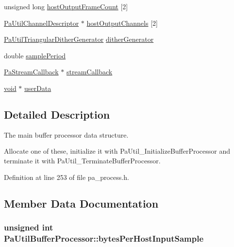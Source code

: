 \begin{DoxyCompactItemize}
unsigned long \hyperlink{struct_pa_util_buffer_processor_ac5e048842fdfdee1764ab049a1306cfe}{host\+Output\+Frame\+Count} \mbox{[}2\mbox{]}
\item 
\hyperlink{struct_pa_util_channel_descriptor}{Pa\+Util\+Channel\+Descriptor} $\ast$ \hyperlink{struct_pa_util_buffer_processor_a6d78b9d008d30e6addc9a83470756831}{host\+Output\+Channels} \mbox{[}2\mbox{]}
\item 
\hyperlink{struct_pa_util_triangular_dither_generator}{Pa\+Util\+Triangular\+Dither\+Generator} \hyperlink{struct_pa_util_buffer_processor_a113fbcc8dab47dc9eb29b9541520084b}{dither\+Generator}
\item 
double \hyperlink{struct_pa_util_buffer_processor_aea54ceb550e1d66824d6f8cf55af8489}{sample\+Period}
\item 
\hyperlink{portaudio_8h_a8a60fb2a5ec9cbade3f54a9c978e2710}{Pa\+Stream\+Callback} $\ast$ \hyperlink{struct_pa_util_buffer_processor_af6577f767ed4c58d5e511d125e6b1c4a}{stream\+Callback}
\item 
\hyperlink{sound_8c_ae35f5844602719cf66324f4de2a658b3}{void} $\ast$ \hyperlink{struct_pa_util_buffer_processor_aa0c7b972bd1494d40373e9e13475af4b}{user\+Data}
\end{DoxyCompactItemize}


\subsection{Detailed Description}
The main buffer processor data structure. 

Allocate one of these, initialize it with Pa\+Util\+\_\+\+Initialize\+Buffer\+Processor and terminate it with Pa\+Util\+\_\+\+Terminate\+Buffer\+Processor. 

Definition at line 253 of file pa\+\_\+process.\+h.



\subsection{Member Data Documentation}
\subsubsection[{\texorpdfstring{bytes\+Per\+Host\+Input\+Sample}{bytesPerHostInputSample}}]{\setlength{\rightskip}{0pt plus 5cm}unsigned {\bf int} Pa\+Util\+Buffer\+Processor\+::bytes\+Per\+Host\+Input\+Sample}\hypertarget{struct_pa_util_buffer_processor_ad7d3d4973cfe90f69dbb2fcf16a59d92}{}\label{struct_pa_util_buffer_processor_ad7d3d4973cfe90f69dbb2fcf16a59d92}


